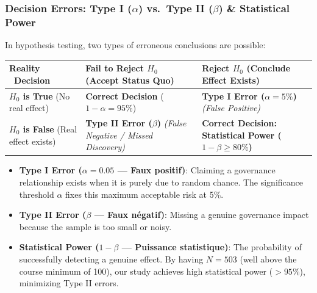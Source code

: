\documentclass[
]{article}
\newcounter{none} %
\providecommand{\tightlist}{%
  \setlength{\itemsep}{0pt}\setlength{\parskip}{0pt}}
\begin{document}
\subsubsection{\texorpdfstring{Decision Errors: Type I (\(\alpha\))
vs.~Type II (\(\beta\)) \& Statistical
Power}{Decision Errors: Type I (\textbackslash alpha) vs.~Type II (\textbackslash beta) \& Statistical Power}}\label{decision-errors-type-i-alpha-vs.-type-ii-beta-statistical-power}

In hypothesis testing, two types of erroneous conclusions are possible:

{\def\LTcaptype{none} %
\begin{longtable}[]{@{}
  >{\raggedright\arraybackslash}p{}
  >{\raggedright\arraybackslash}p{}
  >{\raggedright\arraybackslash}p{}@{}}
\toprule\noalign{}
\begin{minipage}[b]{\linewidth}\raggedright
Reality ~Decision
\end{minipage} & \begin{minipage}[b]{\linewidth}\raggedright
Fail to Reject \(H_0\) (Accept Status Quo)
\end{minipage} & \begin{minipage}[b]{\linewidth}\raggedright
Reject \(H_0\) (Conclude Effect Exists)
\end{minipage} \\
\midrule\noalign{}
\endhead
\bottomrule\noalign{}
\endlastfoot
\textbf{\(H_0\) is True} (No real effect) & \textbf{Correct Decision}
(\(1 - \alpha = 95\%\)) & \textbf{Type I Error (\(\alpha = 5\%\))}
\emph{(False Positive)} \\
\textbf{\(H_0\) is False} (Real effect exists) & \textbf{Type II Error
(\(\beta\))} \emph{(False Negative / Missed Discovery)} &
\textbf{Correct Decision: Statistical Power (\(1 - \beta \ge 80\%\))} \\
\end{longtable}
}

\begin{itemize}
\tightlist
\item
  \textbf{Type I Error (\(\alpha = 0.05\) --- Faux positif)}: Claiming a
  governance relationship exists when it is purely due to random chance.
  The significance threshold \(\alpha\) fixes this maximum acceptable
  risk at 5\%.
\item
  \textbf{Type II Error (\(\beta\) --- Faux négatif)}: Missing a genuine
  governance impact because the sample is too small or noisy.
\item
  \textbf{Statistical Power (\(1 - \beta\) --- Puissance statistique)}:
  The probability of successfully detecting a genuine effect. By having
  \(N = 503\) (well above the course minimum of 100), our study achieves
  high statistical power (\(> 95\%\)), minimizing Type II errors.
\end{itemize}
\end{document}
